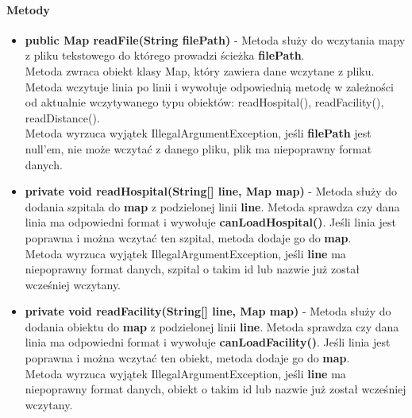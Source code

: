 \documentclass[]{article}
\begin{document}
                \paragraph{Metody}
                    \begin{itemize}
                        \item \textbf{public Map readFile(String filePath)} - 
                            Metoda służy do wczytania mapy z pliku tekstowego do którego prowadzi ścieżka \textbf{filePath}.\\
                            Metoda zwraca obiekt klasy Map, który zawiera dane wczytane z pliku.\\
                            Metoda wczytuje linia po linii i wywołuje odpowiednią metodę w zależności od aktualnie wczytywanego typu obiektów: readHospital(), readFacility(), readDistance().\\
                            Metoda wyrzuca wyjątek IllegalArgumentException, jeśli
                                \textbf{filePath} jest null'em,
                                nie może wczytać z danego pliku,
                                plik ma niepoprawny format danych.
                                
                        \item \textbf{private void readHospital(String[] line, Map map)} - 
                            Metoda służy do dodania szpitala do \textbf{map} z podzielonej linii \textbf{line}.
                            Metoda sprawdza czy dana linia ma odpowiedni format i wywołuje \textbf{canLoadHospital()}.
                            Jeśli linia jest poprawna i można wczytać ten szpital, metoda dodaje go do \textbf{map}.\\
                            Metoda wyrzuca wyjątek IllegalArgumentException, jeśli
                                \textbf{line} ma niepoprawny format danych,
                                szpital o takim id lub nazwie już został wcześniej wczytany.
                        
                        \item \textbf{private void readFacility(String[] line, Map map)} - 
                            Metoda służy do dodania obiektu do \textbf{map} z podzielonej linii \textbf{line}.
                            Metoda sprawdza czy dana linia ma odpowiedni format i wywołuje \textbf{canLoadFacility()}.
                            Jeśli linia jest poprawna i można wczytać ten obiekt, metoda dodaje go do \textbf{map}.\\
                            Metoda wyrzuca wyjątek IllegalArgumentException, jeśli
                                \textbf{line} ma niepoprawny format danych,
                                obiekt o takim id lub nazwie już został wcześniej wczytany.
                                

\end{itemize}
\end{document}
